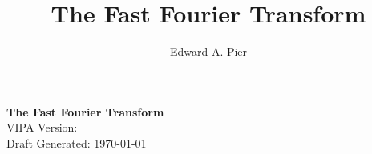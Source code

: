 \documentclass[letter,12pt]{book}
\title{The Fast Fourier Transform}
\author{Edward A. Pier}
\begin{document}
\begin{titlepage}
\begin{center}

\vfill
{\bf \LARGE The Fast Fourier Transform} \\
VIPA Version:
\\
Draft Generated: \today \\
\vfill
\end{center}
\end{titlepage}



\tableofcontents
\pagebreak



\printindex
\end{document}
